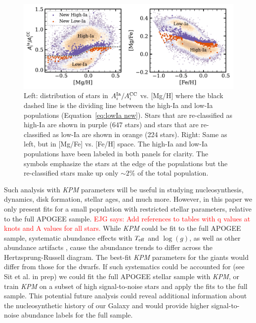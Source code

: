 \documentclass[modern]{aastex631}
\newcommand{\logg}{\log(g)}
\newcommand{\teff}{T_{\rm eff}}
\newcommand{\Acc}{A^{\rm CC}_{i}}
\newcommand{\AIa}{A^{\rm Ia}_{i}}
\newcommand{\ejg}[1]{\textcolor{red}{EJG says: #1}}
\newcommand{\name}{\textsl{KPM}}
\begin{document}
\begin{figure}[htb!]
    \centering
    \includegraphics[width=.9\textwidth]{Paper/Figures/pop_divis.pdf}
    \caption{Left: distribution of stars in $\AIa/\Acc$ vs. [Mg/H] where the black dashed line is the dividing line between the high-Ia and low-Ia populations (Equation~\ref{eq:lowIa new}). Stars that are re-classified as high-Ia are shown in purple (647 stars) and stars that are re-classified as low-Ia are shown in orange (224 stars). Right: Same as left, but in [Mg/Fe] vs. [Fe/H] space. The high-Ia and low-Ia populations have been labeled in both panels for clarity. The symbols emphasize the stars at the edge of the populations but the re-classified stars make up only $\sim 2\%$ of the total population.}
    \label{fig:pop_divis}
\end{figure}

Such analysis with \name{} parameters will be useful in studying nucleosynthesis, dynamics, disk formation, stellar ages, and much more. However, in this paper we only present fits for a small population with restricted stellar parameters, relative to the full APOGEE sample. 
\ejg{Add references to tables with q values at knots and A values for all stars.} While \name{} could be fit to the full APOGEE sample, systematic abundance effects with $\teff$ and $\logg$, as well as other abundance artifacts \citep[e.g.,][]{jonsson2020, griffith2021a}, cause the abundance trends to differ across the Hertzsprung-Russell diagram. The best-fit \name{} parameters for the giants would differ from those for the dwarfs. If such systematics could be accounted for (see Sit et al. in prep) we could fit the full APOGEE stellar sample with \name{}, or train \name{} on a subset of high signal-to-noise stars and apply the fits to the full sample. This potential future analysis could reveal additional information about the nucleosynthetic history of our Galaxy and would provide higher signal-to-noise abundance labels for the full sample.
\end{document}
